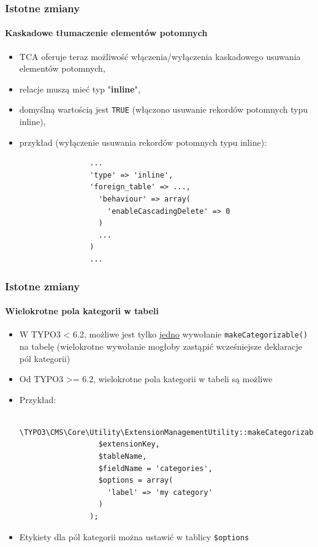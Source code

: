 
\begin{frame}[fragile]
	\frametitle{Istotne zmiany}
	\framesubtitle{Kaskadowe tłumaczenie elementów potomnych}

	\begin{itemize}
		\item TCA oferuje teraz możliwość włączenia/wyłączenia kaskadowego usuwania elementów potomnych, 
		\item relacje muszą mieć typ "\textbf{inline}",
		\item domyślną wartością jest \texttt{TRUE} (włączono usuwanie rekordów potomnych typu inline),
		\item przykład (wyłączenie usuwania rekordów potomnych typu inline):

			\begin{lstlisting}
				...
				'type' => 'inline',
				'foreign_table' => ...,
				  'behaviour' => array(
				    'enableCascadingDelete' => 0
				  )
				  ...
				)
				...
			\end{lstlisting}

	\end{itemize}

\end{frame}


\begin{frame}[fragile]
	\frametitle{Istotne zmiany}
	\framesubtitle{Wielokrotne pola kategorii w tabeli}

	\begin{itemize}
		\item W TYPO3 < 6.2, możliwe jest tylko \underline{jedno} wywołanie \texttt{makeCategorizable()} na tabelę
			(wielokrotne wywołanie mogłoby zastąpić wcześniejsze deklaracje pól kategorii)
		\item Od TYPO3 >= 6.2, wielokrotne pola kategorii w tabeli są możliwe
		\item Przykład:

			\begin{lstlisting}
				\TYPO3\CMS\Core\Utility\ExtensionManagementUtility::makeCategorizable(
				  $extensionKey,
				  $tableName,
				  $fieldName = 'categories',
				  $options = array(
				  	'label' => 'my category'
				  )
				);
			\end{lstlisting}

		\item Etykiety dla pól kategorii można ustawić w tablicy \texttt{\$options}

	\end{itemize}

\end{frame}

